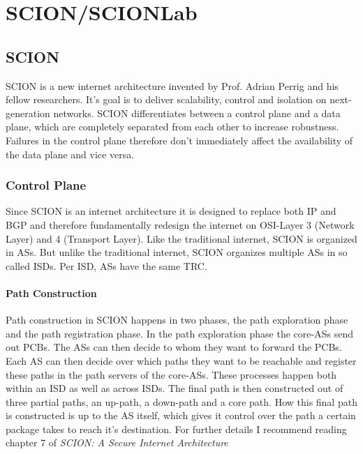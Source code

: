 \chapter{SCION/SCIONLab}
\section{SCION}
\acs{SCION} is a new internet architecture invented by Prof. Adrian Perrig and his fellow researchers. It's goal is to deliver scalability, control and isolation on next-generation networks. \acs{SCION} differentiates between a control plane and a data plane, which are completely separated from each other to increase robustness. Failures in the control plane therefore don't immediately affect the availability of the data plane and vice versa.

\subsection{Control Plane}
Since \acs{SCION} is an internet architecture it is designed to replace both \acs{IP} and \acs{BGP} and therefore fundamentally redesign the internet on \ac{OSI}-Layer 3 (Network Layer) and 4 (Transport Layer). Like the traditional internet, \acs{SCION} is organized in \aclp{AS}. But unlike the traditional internet, \acs{SCION} organizes multiple \acsp{AS} in so called \aclp{ISD}. Per \ac{ISD}, \acsp{AS} have the same \acl{TRC}.

\subsubsection{Path Construction}
Path construction in \acs{SCION} happens in two phases, the path exploration phase and the path registration phase. In the path exploration phase the core-\acsp{AS} send out \acp{PCB}. The \acsp{AS} can then decide to whom they want to forward the \acsp{PCB}. Each \acs{AS} can then decide over which paths they want to be reachable and register these paths in the path servers of the core-\acsp{AS}. These processes happen both within an \acs{ISD} as well as across \acsp{ISD}. The final path is then constructed out of three partial paths, an up-path, a down-path and a core path. How this final path is constructed is up to the \acs{AS} itself, which gives it control over the path a certain package takes to reach it's destination. For further details I recommend reading chapter 7 of \textit{SCION: A Secure Internet Architecture} \cite{perrig2017scion}

